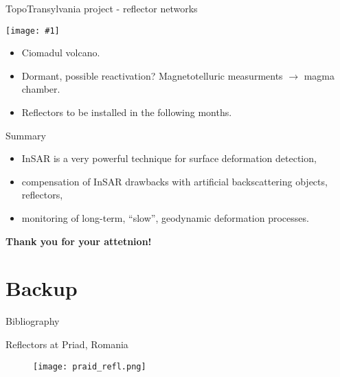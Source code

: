 \documentclass[aspectratio=169]{beamer}
\newcommand{\ffig}[1]{
    \begin{mdframed}[linecolor=red!50!black, linewidth=2pt, roundcorner=2.25pt,
                     innerrightmargin=0pt, innerleftmargin=0pt,
                     innertopmargin=0pt, innerbottommargin=0pt,
                     backgroundcolor=white, frametitle={}, align=center]
        \texttt{[image: \#1]}
    \end{mdframed}
}
\begin{document}
\begin{frame}{TopoTransylvania project - reflector networks}
    \begin{minipage}[c]{0.425\textwidth}
        \ffig{csomad_network_alpha.png}
    \end{minipage}
    \hspace{10pt}
    \begin{minipage}[c]{0.475\textwidth}
        \begin{itemize}
            \pause
            \item Ciomadul volcano.
            \pause
            \item Dormant, possible reactivation? Magnetotelluric measurments
                  $\rightarrow$ magma chamber.
            \pause
            \item Reflectors to be installed in the following months.
        \end{itemize}
    \end{minipage}
\end{frame}

\begin{frame}{Summary}
    \begin{itemize}
        \pause
        \item InSAR is a very powerful technique for surface deformation detection,
        \pause
        \item compensation of InSAR drawbacks with artificial backscattering objects, reflectors,
        \pause
        \item monitoring of long-term, ``slow'',  geodynamic deformation processes.
    \end{itemize}
\end{frame}

\begin{frame}
    \centering
    {\Huge \color{red!65!black} \textbf{Thank you for your attetnion!}}
\end{frame}

\backupbegin

\section*{Backup}

\begin{frame}{Bibliography}
    
        
\end{frame}

\begin{frame}{Reflectors at Priad, Romania}
    \begin{figure}[H]
        \centering
        \texttt{[image: praid\_refl.png]}
    \end{figure}
\end{frame}

\backupend
\end{document}

